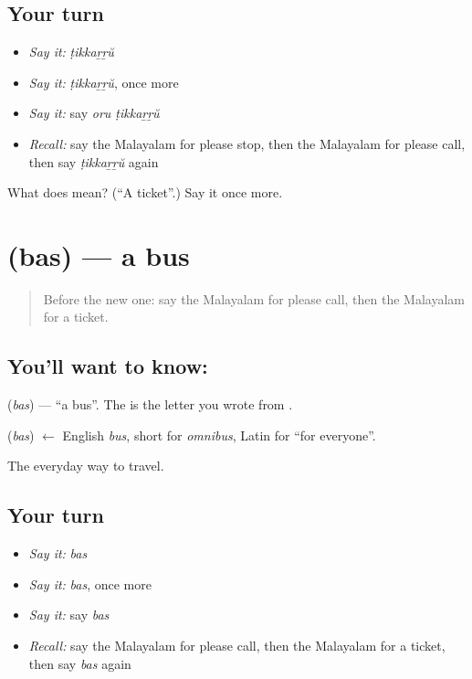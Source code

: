 \subsection*{Your turn}
\begin{itemize}
\raggedright
  \item \emph{Say it:} \emph{ṭikkaṟṟŭ}
  \item \emph{Say it:} \emph{ṭikkaṟṟŭ}, once more
  \item \emph{Say it:} say \emph{oru ṭikkaṟṟŭ}
  \item \emph{Recall:} say the Malayalam for please stop, then the Malayalam for please call, then say \emph{ṭikkaṟṟŭ} again
\end{itemize}

\begin{tcolorbox}[breakable,colback=teal!4,colframe=teal!35!black,title={Before you move on}]
What does  mean? (\textquotedblleft{}A ticket\textquotedblright{}.) Say it once more.
\end{tcolorbox}
\section[\texorpdfstring{\ml{ബസ്} (bas)}{ബസ് (bas)}]{ (bas) — a bus}

\label{lesson:ML-C121-bus}



\begin{quote}
Before the new one: say the Malayalam for please call, then the Malayalam for a ticket.
\end{quote}

\subsection*{You'll want to know: }
\textbf{} (\emph{bas}) — \textquotedblleft{}a bus\textquotedblright{}. The \textbf{} is the letter you wrote from \textbf{}.

\begin{cousinweb}
\textbf{} (\emph{bas}) $\leftarrow$ English \emph{bus}, short for \emph{omnibus}, Latin for \textquotedblleft{}for everyone\textquotedblright{}.
\end{cousinweb}

\begin{grammarlens}[title={What you've built}]
The everyday way to travel.
\end{grammarlens}

\subsection*{Your turn}
\begin{itemize}
\raggedright
  \item \emph{Say it:} \emph{bas}
  \item \emph{Say it:} \emph{bas}, once more
  \item \emph{Say it:} say \emph{bas}
  \item \emph{Recall:} say the Malayalam for please call, then the Malayalam for a ticket, then say \emph{bas} again
\end{itemize}

